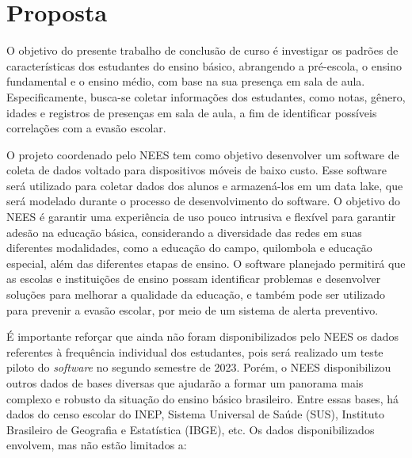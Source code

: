 \chapter{Proposta}

O objetivo do presente trabalho de conclusão de curso é investigar os padrões de características dos estudantes do ensino básico, abrangendo a pré-escola, o ensino fundamental e o ensino médio, com base na sua presença em sala de aula. Especificamente, busca-se coletar informações dos estudantes, como notas, gênero, idades e registros de presenças em sala de aula, a fim de identificar possíveis correlações com a evasão escolar.

O projeto coordenado pelo NEES tem como objetivo desenvolver um software de coleta de dados voltado para dispositivos móveis de baixo custo. Esse software será utilizado para coletar dados dos alunos e armazená-los em um data lake, que será modelado durante o processo de desenvolvimento do software. O objetivo do NEES é garantir uma experiência de uso pouco intrusiva e flexível para garantir adesão na educação básica, considerando a diversidade das redes em suas diferentes modalidades, como a educação do campo, quilombola e educação especial, além das diferentes etapas de ensino. O software planejado permitirá que as escolas e instituições de ensino possam identificar problemas e desenvolver soluções para melhorar a qualidade da educação, e também pode ser utilizado para prevenir a evasão escolar, por meio de um sistema de alerta preventivo.

É importante reforçar que ainda não foram disponibilizados pelo NEES os dados referentes à frequência individual dos estudantes, pois será realizado um teste piloto do \textit{software} no segundo semestre de 2023. Porém, o NEES disponibilizou outros dados de bases diversas que ajudarão a formar um panorama mais complexo e robusto da situação do ensino básico brasileiro. Entre essas bases, há dados do censo escolar do INEP, Sistema Universal de Saúde (SUS), Instituto Brasileiro de Geografia e Estatística (IBGE), etc. Os dados disponibilizados envolvem, mas não estão limitados a:

